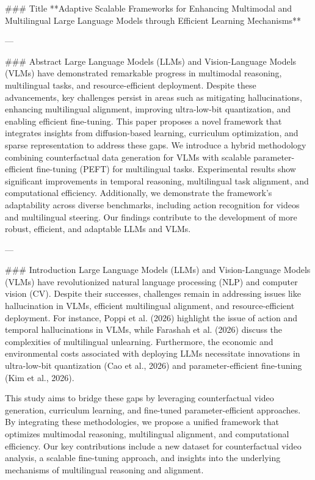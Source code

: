 ### Title
**Adaptive Scalable Frameworks for Enhancing Multimodal and Multilingual Large Language Models through Efficient Learning Mechanisms**

---

### Abstract
Large Language Models (LLMs) and Vision-Language Models (VLMs) have demonstrated remarkable progress in multimodal reasoning, multilingual tasks, and resource-efficient deployment. Despite these advancements, key challenges persist in areas such as mitigating hallucinations, enhancing multilingual alignment, improving ultra-low-bit quantization, and enabling efficient fine-tuning. This paper proposes a novel framework that integrates insights from diffusion-based learning, curriculum optimization, and sparse representation to address these gaps. We introduce a hybrid methodology combining counterfactual data generation for VLMs with scalable parameter-efficient fine-tuning (PEFT) for multilingual tasks. Experimental results show significant improvements in temporal reasoning, multilingual task alignment, and computational efficiency. Additionally, we demonstrate the framework's adaptability across diverse benchmarks, including action recognition for videos and multilingual steering. Our findings contribute to the development of more robust, efficient, and adaptable LLMs and VLMs.

---

### Introduction
Large Language Models (LLMs) and Vision-Language Models (VLMs) have revolutionized natural language processing (NLP) and computer vision (CV). Despite their successes, challenges remain in addressing issues like hallucination in VLMs, efficient multilingual alignment, and resource-efficient deployment. For instance, Poppi et al. (2026) highlight the issue of action and temporal hallucinations in VLMs, while Farashah et al. (2026) discuss the complexities of multilingual unlearning. Furthermore, the economic and environmental costs associated with deploying LLMs necessitate innovations in ultra-low-bit quantization (Cao et al., 2026) and parameter-efficient fine-tuning (Kim et al., 2026).

This study aims to bridge these gaps by leveraging counterfactual video generation, curriculum learning, and fine-tuned parameter-efficient approaches. By integrating these methodologies, we propose a unified framework that optimizes multimodal reasoning, multilingual alignment, and computational efficiency. Our key contributions include a new dataset for counterfactual video analysis, a scalable fine-tuning approach, and insights into the underlying mechanisms of multilingual reasoning and alignment.

